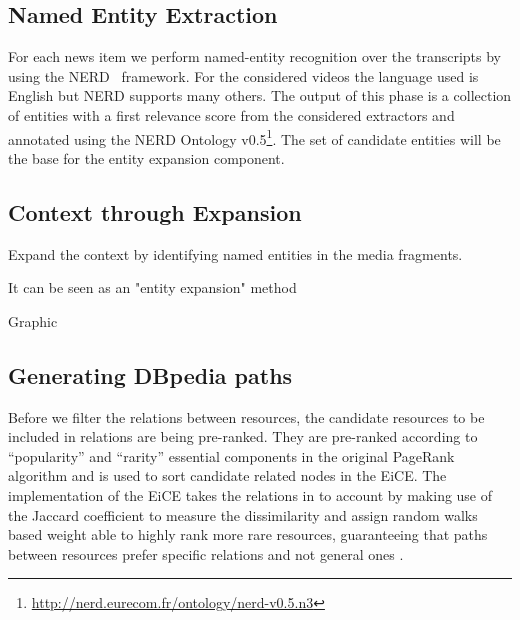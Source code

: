 \documentclass{acm_proc_article-sp}
\begin{document}
\subsection{Named Entity Extraction}

For each news item we perform named-entity recognition over the transcripts by using the NERD~\cite{Rizzo2012b} framework. For the considered videos the language used is English but NERD supports many others. The output of this phase is a collection of entities with a first relevance score from the considered extractors and annotated using the NERD Ontology v0.5\footnote{\url{http://nerd.eurecom.fr/ontology/nerd-v0.5.n3}}. The set of candidate entities will be the base for the entity expansion component.

\subsection{Context through Expansion}

Expand the context by identifying named entities in the media fragments.


It can be seen as an "entity expansion" method

Graphic

\subsection{Generating DBpedia paths}

Before we filter the relations between resources, the candidate resources to be included in relations are being pre-ranked. They are pre-ranked according to ``popularity'' and ``rarity'' essential components in the original PageRank algorithm \cite{page1999pagerank} and is used to sort candidate related nodes in the EiCE. The implementation of the EiCE takes the relations in to account by making use of the Jaccard coefficient to measure the dissimilarity and assign random walks based weight able to highly rank more rare resources, guaranteeing that paths between resources prefer specific relations and not general ones \cite{moore2012novel}.

\end{document}
